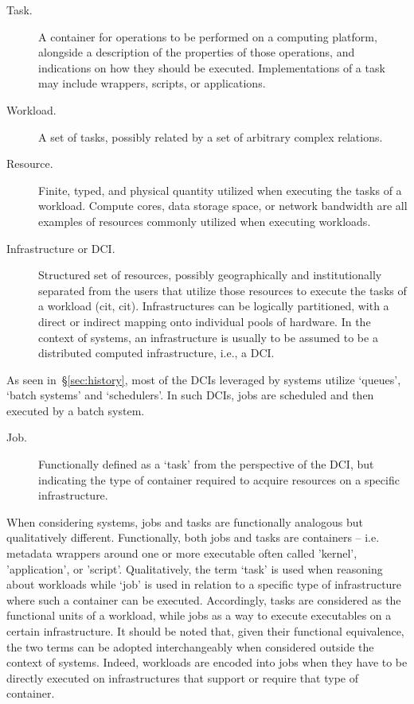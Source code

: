 \documentclass{sig-alternate}
\begin{document}
\begin{description}

\item[Task.] A container for operations to be performed on a computing
platform, alongside a description of the properties of those operations,
and indications on how they should be executed. Implementations of a
task may include wrappers, scripts, or applications.

\item[Workload.] A set of tasks, possibly related by a set of arbitrary
complex relations.

\item[Resource.] Finite, typed, and physical quantity utilized when
executing the tasks of a workload. Compute cores, data storage space, or
network bandwidth are all examples of resources commonly utilized when
executing workloads.

\item[Infrastructure or DCI.] Structured set of resources, possibly
geographically and institutionally separated from the users that utilize
those resources to execute the tasks of a workload (cit, cit).
Infrastructures can be logically partitioned, with a direct or indirect
mapping onto individual pools of hardware. In the context of \pilot
systems, an infrastructure is usually to be assumed to be a distributed
computed infrastructure, i.e., a DCI.

\end{description}

As seen in~\S\ref{sec:history}, most of the DCIs leveraged by \pilot
systems utilize `queues', `batch systems' and `schedulers'. In such
DCIs, jobs are scheduled and then executed by a batch system.

\begin{description}

\item[Job.] Functionally defined as a `task' from the perspective of the DCI,
but indicating the type of container required to acquire resources on a
specific infrastructure.

\end{description}

When considering \pilot systems, jobs and tasks are functionally
analogous but qualitatively different. Functionally, both jobs and tasks
are containers -- i.e. metadata wrappers around one or more executable
often called 'kernel', 'application', or 'script'. Qualitatively, the
term `task' is used when reasoning about workloads while `job' is used
in relation to a specific type of infrastructure where such a container
can be executed. Accordingly, tasks are considered as the functional
units of a workload, while jobs as a way to execute executables on a
certain infrastructure. It should be noted that, given their functional
equivalence, the two terms can be adopted interchangeably when
considered outside the context of \pilot systems. Indeed, workloads are
encoded into jobs when they have to be directly executed on
infrastructures that support or require that type of container.
\end{document}
